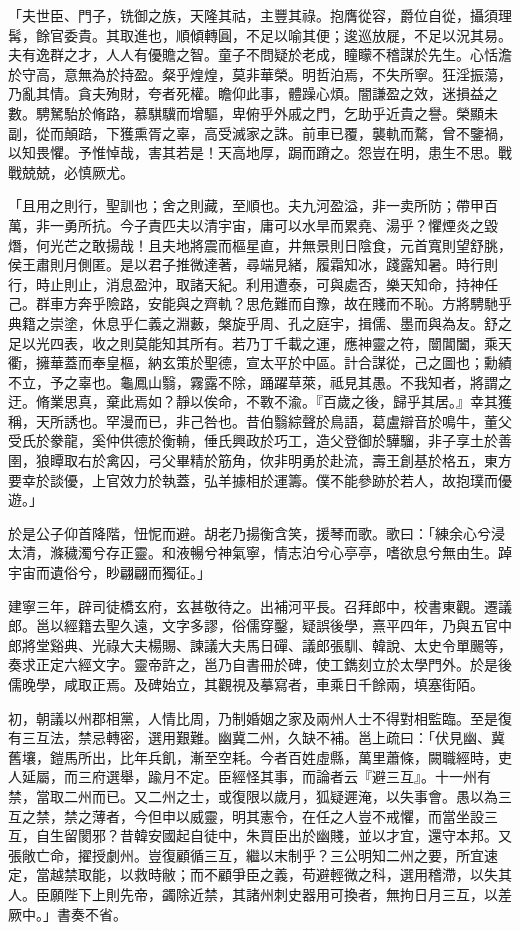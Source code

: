 \begin{pinyinscope}
「夫世臣、門子，铣御之族，天隆其祜，主豐其祿。抱膺從容，爵位自從，攝須理髯，餘官委貴。其取進也，順傾轉圓，不足以喻其便；逡巡放屣，不足以況其易。夫有逸群之才，人人有優贍之智。童子不問疑於老成，瞳矇不稽謀於先生。心恬澹於守高，意無為於持盈。粲乎煌煌，莫非華榮。明哲泊焉，不失所寧。狂淫振蕩，乃亂其情。貪夫殉財，夸者死權。瞻仰此事，體躁心煩。闇謙盈之效，迷損益之數。騁駑駘於脩路，慕騏驥而增驅，卑俯乎外戚之門，乞助乎近貴之譽。榮顯未副，從而顛踣，下獲熏胥之辜，高受滅家之誅。前車已覆，襲軌而騖，曾不鑒禍，以知畏懼。予惟悼哉，害其若是！天高地厚，跼而蹐之。怨豈在明，患生不思。戰戰兢兢，必慎厥尤。

「且用之則行，聖訓也；舍之則藏，至順也。夫九河盈溢，非一卖所防；帶甲百萬，非一勇所抗。今子責匹夫以清宇宙，庸可以水旱而累堯、湯乎？懼煙炎之毀熸，何光芒之敢揚哉！且夫地將震而樞星直，井無景則日陰食，元首寬則望舒朓，侯王肅則月側匿。是以君子推微達著，尋端見緒，履霜知冰，踐露知暑。時行則行，時止則止，消息盈沖，取諸天紀。利用遭泰，可與處否，樂天知命，持神任己。群車方奔乎險路，安能與之齊軌？思危難而自豫，故在賤而不恥。方將騁馳乎典籍之崇塗，休息乎仁義之淵藪，槃旋乎周、孔之庭宇，揖儒、墨而與為友。舒之足以光四表，收之則莫能知其所有。若乃丁千載之運，應神靈之符，闓閶闔，乘天衢，擁華蓋而奉皇樞，納玄策於聖德，宣太平於中區。計合謀從，己之圖也；勳績不立，予之辜也。龜鳳山翳，霧露不除，踊躍草萊，祗見其愚。不我知者，將謂之迂。脩業思真，棄此焉如？靜以俟命，不斁不渝。『百歲之後，歸乎其居。』幸其獲稱，天所誘也。罕漫而已，非己咎也。昔伯翳綜聲於鳥語，葛盧辯音於鳴牛，董父受氏於豢龍，奚仲供德於衡輈，倕氏興政於巧工，造父登御於驊騮，非子享土於善圉，狼瞫取右於禽囚，弓父畢精於筋角，佽非明勇於赴流，壽王創基於格五，東方要幸於談優，上官效力於執蓋，弘羊據相於運籌。僕不能參跡於若人，故抱璞而優遊。」

於是公子仰首降階，忸怩而避。胡老乃揚衡含笑，援琴而歌。歌曰：「練余心兮浸太清，滌穢濁兮存正靈。和液暢兮神氣寧，情志泊兮心亭亭，嗜欲息兮無由生。踔宇宙而遺俗兮，眇翩翩而獨征。」

建寧三年，辟司徒橋玄府，玄甚敬待之。出補河平長。召拜郎中，校書東觀。遷議郎。邕以經籍去聖久遠，文字多謬，俗儒穿鑿，疑誤後學，熹平四年，乃與五官中郎將堂谿典、光祿大夫楊賜、諫議大夫馬日磾、議郎張馴、韓說、太史令單颺等，奏求正定六經文字。靈帝許之，邕乃自書冊於碑，使工鐫刻立於太學門外。於是後儒晚學，咸取正焉。及碑始立，其觀視及摹寫者，車乘日千餘兩，填塞街陌。

初，朝議以州郡相黨，人情比周，乃制婚姻之家及兩州人士不得對相監臨。至是復有三互法，禁忌轉密，選用艱難。幽冀二州，久缺不補。邕上疏曰：「伏見幽、冀舊壤，鎧馬所出，比年兵飢，漸至空耗。今者百姓虛縣，萬里蕭條，闕職經時，吏人延屬，而三府選舉，踰月不定。臣經怪其事，而論者云『避三互』。十一州有禁，當取二州而已。又二州之士，或復限以歲月，狐疑遲淹，以失事會。愚以為三互之禁，禁之薄者，今但申以威靈，明其憲令，在任之人豈不戒懼，而當坐設三互，自生留閡邪？昔韓安國起自徒中，朱買臣出於幽賤，並以才宜，還守本邦。又張敞亡命，擢授劇州。豈復顧循三互，繼以末制乎？三公明知二州之要，所宜速定，當越禁取能，以救時敝；而不顧爭臣之義，苟避輕微之科，選用稽滯，以失其人。臣願陛下上則先帝，蠲除近禁，其諸州刺史器用可換者，無拘日月三互，以差厥中。」書奏不省。


\end{pinyinscope}
